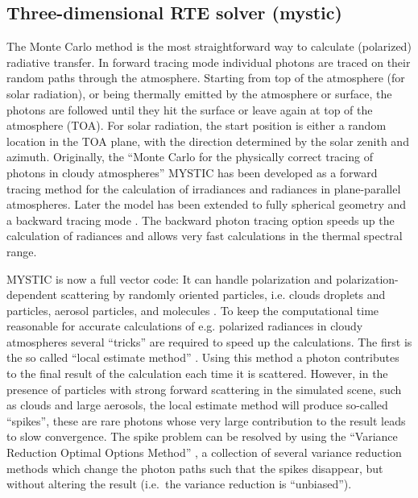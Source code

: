 \subsection{Three-dimensional RTE solver  (mystic)} 
\label{sec:mystic}

The Monte Carlo method is the most straightforward way to calculate 
(polarized) radiative transfer. In forward tracing mode  
individual photons are traced on their random paths through the atmosphere.
Starting from top of the atmosphere (for solar radiation), or being thermally
emitted by the atmosphere or surface, the photons are followed until they
hit the surface or leave again at top of the atmosphere (TOA). For
solar radiation, the start position is either a random location in the
TOA plane, with the direction determined by the solar zenith and
azimuth. Originally, the ``Monte Carlo for the physically correct tracing of
photons in cloudy atmospheres'' MYSTIC \citep{mayer2009} has been developed as
a forward tracing method for the calculation of irradiances and radiances in
 plane-parallel atmospheres. Later the model has been extended to fully
spherical geometry and a backward tracing mode \citep{emde2007}. The backward
photon tracing option speeds up the calculation of radiances and allows very
fast calculations in the thermal spectral range.  


MYSTIC is now a full vector code: It can handle polarization and
polarization-dependent scattering by randomly oriented particles,
i.e. clouds droplets and particles, aerosol particles, and molecules
\citep{emde2010}. To keep the computational time reasonable for
accurate calculations of e.g. polarized radiances in cloudy
atmospheres several ``tricks'' are required to speed up the
calculations. The first is the so called ``local estimate method''
\citep{marshak2005}. Using this method a photon contributes to the
final result of the calculation each time it is scattered. However, in
the presence of particles with strong forward scattering in the
simulated scene, such as clouds and large aerosols, the local estimate
method will produce so-called ``spikes'', these are rare photons whose
very large contribution to the result leads to slow convergence. The spike
problem can be resolved by using the ``Variance Reduction Optimal
Options Method'' \citep[VROOM,][]{buras2011a}, a collection of several
variance reduction methods which change the photon paths such that the
spikes disappear, but without altering the result (i.e.~the variance
reduction is ``unbiased'').

